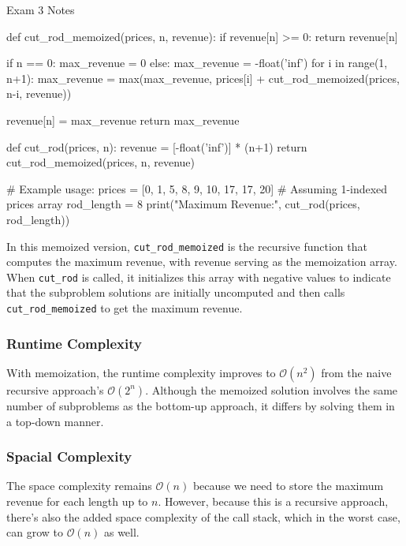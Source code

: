 \begin{examnotes}{Exam 3 Notes}
\begin{highlight}
    \begin{code}[Python]
    def cut_rod_memoized(prices, n, revenue):
        if revenue[n] >= 0:
            return revenue[n]
        
        if n == 0:
            max_revenue = 0
        else:
            max_revenue = -float('inf')
            for i in range(1, n+1):
                max_revenue = max(max_revenue, prices[i] + cut_rod_memoized(prices, n-i, revenue))
        
        revenue[n] = max_revenue
        return max_revenue
    
    def cut_rod(prices, n):
        revenue = [-float('inf')] * (n+1)
        return cut_rod_memoized(prices, n, revenue)
    
    # Example usage:
    prices = [0, 1, 5, 8, 9, 10, 17, 17, 20]  # Assuming 1-indexed prices array
    rod_length = 8
    print("Maximum Revenue:", cut_rod(prices, rod_length))
    \end{code}
        In this memoized version, \texttt{cut\_rod\_memoized} is the recursive function that computes the maximum revenue, with revenue serving as the memoization array. When \texttt{cut\_rod} is called, 
        it initializes this array with negative values to indicate that the subproblem solutions are initially uncomputed and then calls \texttt{cut\_rod\_memoized} to get the maximum revenue. \vspace*{1em}

        \subsubsection*{Runtime Complexity}

        With memoization, the runtime complexity improves to $\mathcal{O}(n^2)$ from the naive recursive approach's $\mathcal{O}(2^n)$. Although the memoized solution involves the same number of subproblems 
        as the bottom-up approach, it differs by solving them in a top-down manner. \vspace*{1em}

        \subsubsection*{Spacial Complexity}

        The space complexity remains $\mathcal{O}(n)$ because we need to store the maximum revenue for each length up to $n$. However, because this is a recursive approach, there's also the added space 
        complexity of the call stack, which in the worst case, can grow to $\mathcal{O}(n)$ as well.
    \end{highlight}


\end{examnotes}
